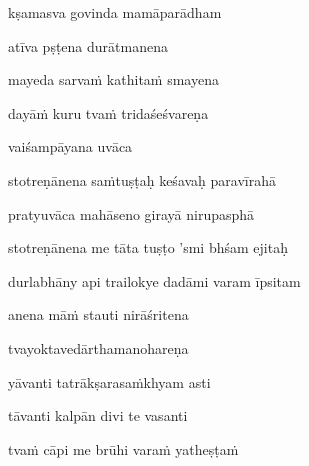 \ujvers\nemsloka 
kṣamasva govinda mamāparādham
\dontdisplaylinenum

\nemslokab 
atīva pṣṭena durātmanena \danda\dontdisplaylinenum

\nemslokac 
mayeda sarva\.m kathita\.m smayena
\dontdisplaylinenum

\nemslokad 
dayā\.m kuru tva\.m tridaśeśvareṇa \veg\dontdisplaylinenum

\vers

vaiśampāyana uvāca~{\dandab}\dontdisplaylinenum 

stotreṇānena sa\.mtuṣṭaḥ keśavaḥ paravīrahā\thinspace{\danda} \dontdisplaylinenum

pratyuvāca mahāseno girayā nirupasphā \veg\dontdisplaylinenum

stotreṇānena me tāta tuṣṭo 'smi bhśam ejitaḥ\thinspace{\dandab} \dontdisplaylinenum

durlabhāny api trailokye dadāmi varam īpsitam \veg\dontdisplaylinenum

\ujvers\nemsloka 
anena mā\.m stauti nirāśritena
\dontdisplaylinenum

\nemslokab 
tvayoktavedārthamanohareṇa \danda\dontdisplaylinenum

\nemslokac 
yāvanti tatrākṣarasa\.mkhyam asti
\dontdisplaylinenum

\nemslokad 
tāvanti kalpān divi te vasanti \veg\dontdisplaylinenum

\ujvers\nemsloka 
tva\.m cāpi me brūhi vara\.m yatheṣṭa\.m
\dontdisplaylinenum

